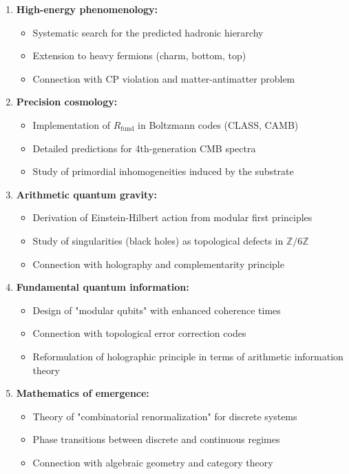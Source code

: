 \documentclass[11pt, a4paper]{article}
\theoremstyle{plain}
\theoremstyle{definition}
\newcommand{\Zmod}{\mathbb{Z}/6\mathbb{Z}}
\newcommand{\Rfactor}{R_{\text{fund}}}
\begin{document}
\begin{enumerate}
    \item \textbf{High-energy phenomenology:}
    \begin{itemize}
        \item Systematic search for the predicted hadronic hierarchy
        \item Extension to heavy fermions (charm, bottom, top)
        \item Connection with CP violation and matter-antimatter problem
    \end{itemize}
    
    \item \textbf{Precision cosmology:}
    \begin{itemize}
        \item Implementation of $\Rfactor$ in Boltzmann codes (CLASS, CAMB)
        \item Detailed predictions for 4th-generation CMB spectra
        \item Study of primordial inhomogeneities induced by the substrate
    \end{itemize}
    
    \item \textbf{Arithmetic quantum gravity:}
    \begin{itemize}
        \item Derivation of Einstein-Hilbert action from modular first principles
        \item Study of singularities (black holes) as topological defects in $\Zmod$
        \item Connection with holography and complementarity principle
    \end{itemize}
    
    \item \textbf{Fundamental quantum information:}
    \begin{itemize}
        \item Design of "modular qubits" with enhanced coherence times
        \item Connection with topological error correction codes
        \item Reformulation of holographic principle in terms of arithmetic information theory
    \end{itemize}
    
    \item \textbf{Mathematics of emergence:}
    \begin{itemize}
        \item Theory of "combinatorial renormalization" for discrete systems
        \item Phase transitions between discrete and continuous regimes
        \item Connection with algebraic geometry and category theory
    \end{itemize}
\end{enumerate}
\end{document}
